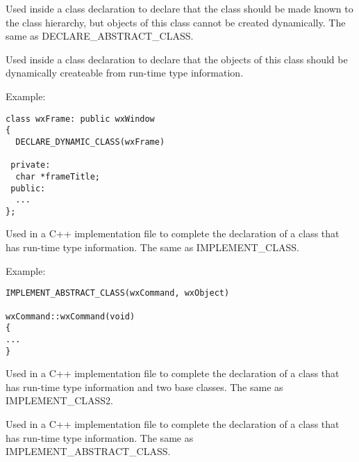 

Used inside a class declaration to declare that the class should be
made known to the class hierarchy, but objects of this class cannot be created
dynamically. The same as DECLARE\_ABSTRACT\_CLASS.



Used inside a class declaration to declare that the objects of this class should be dynamically
createable from run-time type information.

Example:

\begin{verbatim}
class wxFrame: public wxWindow
{
  DECLARE_DYNAMIC_CLASS(wxFrame)

 private:
  char *frameTitle;
 public:
  ...
};
\end{verbatim}



Used in a C++ implementation file to complete the declaration of
a class that has run-time type information. The same as IMPLEMENT\_CLASS.

Example:

\begin{verbatim}
IMPLEMENT_ABSTRACT_CLASS(wxCommand, wxObject)

wxCommand::wxCommand(void)
{
...
}
\end{verbatim}



Used in a C++ implementation file to complete the declaration of
a class that has run-time type information and two base classes. The same as IMPLEMENT\_CLASS2.



Used in a C++ implementation file to complete the declaration of
a class that has run-time type information. The same as IMPLEMENT\_ABSTRACT\_CLASS.


